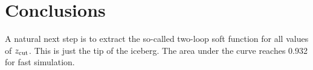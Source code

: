 \section{Conclusions}\label{sec:conclusions}

A natural next step is to extract the so-called two-loop soft function
for all values of $z_{\rm cut}$. This is just the tip of the iceberg.
The area under the curve reaches 0.932 for fast simulation.

